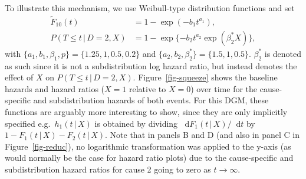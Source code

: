 \documentclass[
  letterpaper,
  paper=240mm:170mm,
  twoside=true,
  open=right,
  fontsize=10pt,
  pagesize=false,
  BCOR=15mm,
  DIV=14,
  headinclude=true,
  footinclude=false,
  headsepline=on]{scrbook}
\newcommand{\given}{\,|\,}
\newcommand\diff{\mathop{}\!\mathrm{d}}
\begin{document}
To illustrate this mechanism, we use Weibull-type distribution functions
and set \begin{align*}
    \tilde{F}_{10}(t) &= 1 - \exp(-b_1t^{a_1}), \\
    P(T \leq t \given D=2, X) &= 1 - \exp\{-b_2t^{a_2}\exp(\beta^*_2 X)\},
\end{align*} with \(\{a_1, b_1, \beta_1, p\} = \{1.25, 1, 0.5, 0.2\}\)
and \(\{a_2, b_2,\beta^*_2\} = \{1.5, 1, 0.5\}\). \(\beta^*_2\) is
denoted as such since it is not a subdistribution log hazard ratio, but
instead denotes the effect of \(X\) on \(P(T \leq t \given D=2, X)\).
Figure~\ref{fig-squeeze} shows the baseline hazards and hazard ratios
(\(X = 1\) relative to \(X = 0\)) over time for the cause-specific and
subdistribution hazards of both events. For this DGM, these functions
are arguably more interesting to show, since they are only implicitly
specified e.g.~\(h_1(t \given X)\) is obtained by dividing
\(\diff F_1(t \given X)/\diff t\) by
\(1 - F_1(t \given X) - F_2(t \given X)\). Note that in panels B and D
(and also in panel C in Figure~\ref{fig-reduc}), no logarithmic
transformation was applied to the y-axis (as would normally be the case
for hazard ratio plots) due to the cause-specific and subdistribution
hazard ratios for cause 2 going to zero as \(t \to \infty\).
\end{document}
